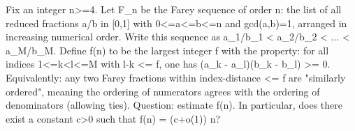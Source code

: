 Fix an integer n>=4. Let F_n be the Farey sequence of order n: the list of all reduced fractions a/b in [0,1] with 0<=a<=b<=n and gcd(a,b)=1, arranged in increasing numerical order. Write this sequence as
  a_1/b_1 < a_2/b_2 < ... < a_M/b_M.
Define f(n) to be the largest integer f with the property:
  for all indices 1<=k<l<=M with l-k <= f, one has (a_k - a_l)(b_k - b_l) >= 0.
Equivalently: any two Farey fractions within index-distance <= f are "similarly ordered", meaning the ordering of numerators agrees with the ordering of denominators (allowing ties).
Question: estimate f(n). In particular, does there exist a constant c>0 such that f(n) = (c+o(1)) n?
